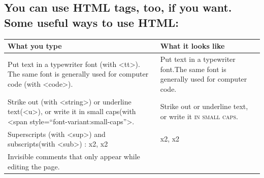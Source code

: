 \documentclass[]{book}
\begin{document}
\subsection{You can use HTML tags, too, if you want. Some useful ways to
use
HTML:}\label{you-can-use-html-tags-too-if-you-want.-some-useful-ways-to-use-html}

\begin{longtable}[]{@{}ll@{}}
\toprule
\begin{minipage}[b]{0.45\columnwidth}\raggedright\strut
What you type\strut
\end{minipage} & \begin{minipage}[b]{0.50\columnwidth}\raggedright\strut
What it looks like\strut
\end{minipage}\tabularnewline
\midrule
\endhead
\begin{minipage}[t]{0.45\columnwidth}\raggedright\strut
Put text in a typewriter font (with \textless{}tt\textgreater{}). The
same font is generally used for computer code (with
\textless{}code\textgreater{}).\strut
\end{minipage} & \begin{minipage}[t]{0.50\columnwidth}\raggedright\strut
Put text in a typewriter font.The same font is generally used for
computer code.\strut
\end{minipage}\tabularnewline
\begin{minipage}[t]{0.45\columnwidth}\raggedright\strut
Strike out (with \textless{}string\textgreater{}) or underline
text(\textless{}u\textgreater{}), or write it in small caps(with
\textless{}span style=``font-variant:small-caps''\textgreater{}.\strut
\end{minipage} & \begin{minipage}[t]{0.50\columnwidth}\raggedright\strut
Strike out or underline text, or write it \textsc{ in small caps}.\strut
\end{minipage}\tabularnewline
\begin{minipage}[t]{0.45\columnwidth}\raggedright\strut
Superscripts (with \textless{}sup\textgreater{}) and subscripts(with
\textless{}sub\textgreater{}) : x2, x2\strut
\end{minipage} & \begin{minipage}[t]{0.50\columnwidth}\raggedright\strut
x2, x2\strut
\end{minipage}\tabularnewline
\begin{minipage}[t]{0.45\columnwidth}\raggedright\strut
Invisible comments that only appear while editing the page.\strut
\end{minipage} & \begin{minipage}[t]{0.50\columnwidth}\raggedright\strut
\strut
\end{minipage}\tabularnewline
\bottomrule
\end{longtable}
\end{document}
